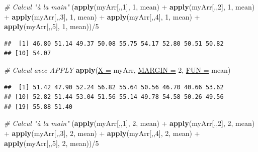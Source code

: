 \documentclass[twoside,symmetric]{book}
\newenvironment{Shaded}{}{}
\newcommand{\CommentTok}[1]{\textit{#1}}
\newcommand{\DataTypeTok}[1]{\underline{#1}}
\newcommand{\DecValTok}[1]{#1}
\newcommand{\KeywordTok}[1]{\textbf{#1}}
\newcommand{\NormalTok}[1]{#1}
\newcommand{\OperatorTok}[1]{#1}
\newcommand{\StringTok}[1]{#1}
\begin{document}
\begin{Shaded}
\begin{Highlighting}[]
\CommentTok{# Calcul "à la main"}
\NormalTok{(}\KeywordTok{apply}\NormalTok{(myArr[,,}\DecValTok{1}\NormalTok{], }\DecValTok{1}\NormalTok{, mean) }\OperatorTok{+}\StringTok{ }\KeywordTok{apply}\NormalTok{(myArr[,,}\DecValTok{2}\NormalTok{], }\DecValTok{1}\NormalTok{, mean) }\OperatorTok{+}\StringTok{ }
\StringTok{  }\KeywordTok{apply}\NormalTok{(myArr[,,}\DecValTok{3}\NormalTok{], }\DecValTok{1}\NormalTok{, mean) }\OperatorTok{+}\StringTok{ }\KeywordTok{apply}\NormalTok{(myArr[,,}\DecValTok{4}\NormalTok{], }\DecValTok{1}\NormalTok{, mean) }\OperatorTok{+}\StringTok{ }
\StringTok{  }\KeywordTok{apply}\NormalTok{(myArr[,,}\DecValTok{5}\NormalTok{], }\DecValTok{1}\NormalTok{, mean))}\OperatorTok{/}\DecValTok{5}
\end{Highlighting}
\end{Shaded}

\begin{verbatim}
##  [1] 46.80 51.14 49.37 50.08 55.75 54.17 52.80 50.51 50.82
## [10] 54.07
\end{verbatim}

\begin{Shaded}
\begin{Highlighting}[]
\CommentTok{# Calcul avec APPLY}
\KeywordTok{apply}\NormalTok{(}\DataTypeTok{X =}\NormalTok{ myArr, }\DataTypeTok{MARGIN =} \DecValTok{2}\NormalTok{, }\DataTypeTok{FUN =}\NormalTok{ mean)}
\end{Highlighting}
\end{Shaded}

\begin{verbatim}
##  [1] 51.42 47.90 52.24 56.82 55.64 50.56 46.70 40.66 53.62
## [10] 52.82 51.44 53.04 51.56 55.14 49.78 54.58 50.26 49.56
## [19] 55.88 51.40
\end{verbatim}

\begin{Shaded}
\begin{Highlighting}[]
\CommentTok{# Calcul "à la main"}
\NormalTok{(}\KeywordTok{apply}\NormalTok{(myArr[,,}\DecValTok{1}\NormalTok{], }\DecValTok{2}\NormalTok{, mean) }\OperatorTok{+}\StringTok{ }\KeywordTok{apply}\NormalTok{(myArr[,,}\DecValTok{2}\NormalTok{], }\DecValTok{2}\NormalTok{, mean) }\OperatorTok{+}\StringTok{ }
\StringTok{  }\KeywordTok{apply}\NormalTok{(myArr[,,}\DecValTok{3}\NormalTok{], }\DecValTok{2}\NormalTok{, mean) }\OperatorTok{+}\StringTok{ }\KeywordTok{apply}\NormalTok{(myArr[,,}\DecValTok{4}\NormalTok{], }\DecValTok{2}\NormalTok{, mean) }\OperatorTok{+}\StringTok{ }
\StringTok{  }\KeywordTok{apply}\NormalTok{(myArr[,,}\DecValTok{5}\NormalTok{], }\DecValTok{2}\NormalTok{, mean))}\OperatorTok{/}\DecValTok{5}
\end{Highlighting}
\end{Shaded}
\end{document}

